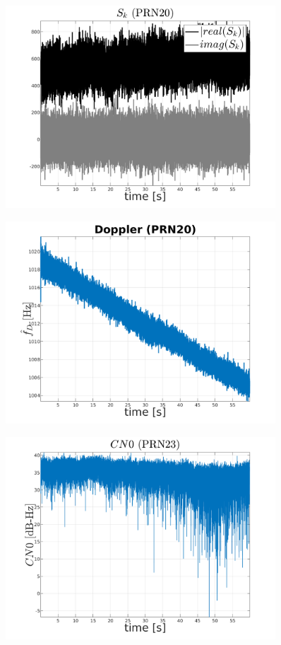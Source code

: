 \begin{figure}[H]
	\centering
	\includegraphics[width=0.9\textwidth]{fig/sk_PRN20.png}
\end{figure}

\begin{figure}[H]
	\centering
	\includegraphics[width=0.9\textwidth]{fig/doppler_PRN20.png}
\end{figure}

\begin{figure}[H]
	\centering
	\includegraphics[width=0.9\textwidth]{fig/CN0_PRN23.png}
\end{figure}

